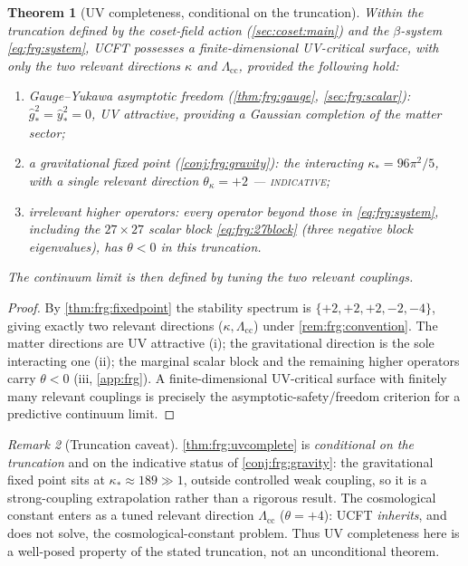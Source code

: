 \documentclass[11pt]{article}
\theoremstyle{plain}
\newtheorem{theorem}{Theorem}[section]
\theoremstyle{definition}
\theoremstyle{remark}
\newtheorem{remark}[theorem]{Remark}
\begin{document}
\begin{theorem}[UV completeness, conditional on the truncation]
\label{thm:frg:uvcomplete}
Within the truncation defined by the coset-field action
(\autoref{sec:coset:main}) and the $\beta$-system \eqref{eq:frg:system}, UCFT
possesses a finite-dimensional UV-critical surface, with only the two
relevant directions $\kappa$ and $\Lambda_{\mathrm{cc}}$, provided the
following hold:
\begin{enumerate}
  \item[\textnormal{(i)}] \emph{Gauge--Yukawa asymptotic freedom}
        (\autoref{thm:frg:gauge}, \autoref{sec:frg:scalar}):
        $\hat g^{2}_{\ast}=\hat y^{2}_{\ast}=0$, UV attractive, providing
        a Gaussian completion of the matter sector;
  \item[\textnormal{(ii)}] \emph{a gravitational fixed point}
        (\autoref{conj:frg:gravity}): the interacting
        $\kappa_{\ast}=96\pi^{2}/5$, with a single relevant direction
        $\theta_{\kappa}=+2$ --- \textsc{indicative};
  \item[\textnormal{(iii)}] \emph{irrelevant higher operators}: every
        operator beyond those in \eqref{eq:frg:system}, including the
        $27\times27$ scalar block \eqref{eq:frg:27block} (three negative
        block eigenvalues), has $\theta<0$ in this truncation.
\end{enumerate}
The continuum limit is then defined by tuning the two relevant couplings.
\end{theorem}

\begin{proof}
By \autoref{thm:frg:fixedpoint} the stability spectrum is
$\{+2,+2,+2,-2,-4\}$, giving exactly two relevant directions
($\kappa,\Lambda_{\mathrm{cc}}$) under \autoref{rem:frg:convention}. The
matter directions are UV attractive (i); the gravitational direction is
the sole interacting one (ii); the marginal scalar block and the remaining
higher operators carry $\theta<0$ (iii, \autoref{app:frg}). A
finite-dimensional UV-critical surface with finitely many relevant
couplings is precisely the asymptotic-safety/freedom criterion for a
predictive continuum limit.
\end{proof}

\begin{remark}[Truncation caveat]
\label{rem:frg:caveat}
\autoref{thm:frg:uvcomplete} is \emph{conditional on the truncation} and on
the indicative status of \autoref{conj:frg:gravity}: the gravitational
fixed point sits at $\kappa_{\ast}\approx189\gg1$, outside controlled weak
coupling, so it is a strong-coupling extrapolation rather than a rigorous
result. The cosmological constant enters as a tuned relevant direction
$\Lambda_{\mathrm{cc}}$ ($\theta=+4$): UCFT \emph{inherits}, and does not
solve, the cosmological-constant problem. Thus UV completeness here is a
well-posed property of the stated truncation, not an unconditional theorem.
\end{remark}
\end{document}
